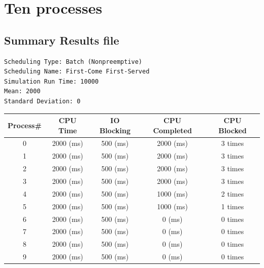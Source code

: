 \section{Ten processes}
\subsection{Summary Results file}                                              
\begin{lstlisting}
Scheduling Type: Batch (Nonpreemptive)
Scheduling Name: First-Come First-Served
Simulation Run Time: 10000
Mean: 2000
Standard Deviation: 0
\end{lstlisting}
\begin{center}                                                                 
\begin{tabular}{| c | c | c | c | c |}                                         
\hline                                                                         
Process\# &     CPU Time &      IO Blocking & CPU Completed & CPU Blocked \\
\hline
0		&2000 (ms)	&500 (ms)&	2000 (ms)&	3 times \\
\hline
1		&2000 (ms)	&500 (ms)&	2000 (ms)&	3 times \\
\hline
2		&2000 (ms)	&500 (ms)&	2000 (ms)&	3 times \\
\hline
3		&2000 (ms)	&500 (ms)&	2000 (ms)&	3 times \\
\hline
4		&2000 (ms)	&500 (ms)&	1000 (ms)&	2 times \\ 
\hline
5		&2000 (ms)	&500 (ms)&	1000 (ms)&	1 times \\
\hline
6		&2000 (ms)	&500 (ms)&	0 (ms)&		0 times \\
\hline
7		&2000 (ms)	&500 (ms)&	0 (ms)&		0 times \\
\hline
8		&2000 (ms)	&500 (ms)&	0 (ms)&		0 times \\
\hline
9		&2000 (ms)	&500 (ms)&	0 (ms)&		0 times \\
\hline
\end{tabular}
\end{center}
